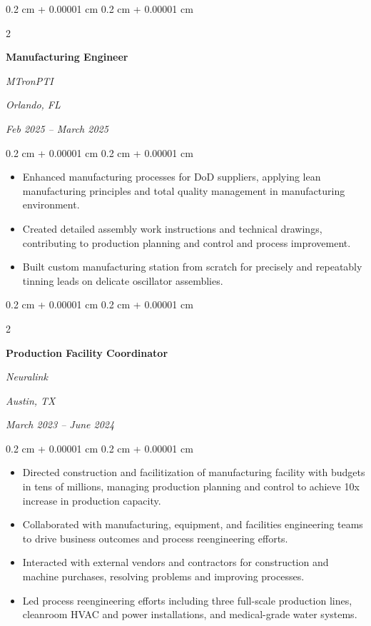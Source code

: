 \documentclass[10pt, letterpaper]{article}
\newenvironment{highlights}{
    \begin{itemize}[
        topsep=0.10 cm,
        parsep=0.10 cm,
        partopsep=0pt,
        itemsep=0pt,
        leftmargin=0.4 cm + 10pt
    ]
}{
    \end{itemize}
} %
\newenvironment{onecolentry}{
    \begin{adjustwidth}{
        0.2 cm + 0.00001 cm
    }{
        0.2 cm + 0.00001 cm
    }
}{
    \end{adjustwidth}
} %
\newenvironment{twocolentry}[2][]{
    \onecolentry
    \def\secondColumn{#2}
    \setcolumnwidth{\fill, 4.5 cm}
    \begin{paracol}{2}
}{
    \switchcolumn \raggedleft \secondColumn
    \end{paracol}
    \endonecolentry
} %
\begin{document}
        \vspace{0.35 cm}

        \begin{twocolentry}{
        \textit{Orlando, FL}    
            
        \textit{Feb 2025 – March 2025}}
            \textbf{Manufacturing Engineer}
            
            \textit{MTronPTI}
        \end{twocolentry}

        \vspace{0.10 cm}
        \begin{onecolentry}
            \begin{highlights}
                \item Enhanced manufacturing processes for DoD suppliers, applying lean manufacturing principles and total quality management in manufacturing environment.
                \item Created detailed assembly work instructions and technical drawings, contributing to production planning and control and process improvement.
                \item Built custom manufacturing station from scratch for precisely and repeatably tinning leads on delicate oscillator assemblies.
            \end{highlights}
        \end{onecolentry}


        \vspace{0.35 cm}

        \begin{twocolentry}{
        \textit{Austin, TX}    
            
        \textit{March 2023 – June 2024}}
            \textbf{Production Facility Coordinator}
            
            \textit{Neuralink}
        \end{twocolentry}

        \vspace{0.10 cm}
        \begin{onecolentry}
            \begin{highlights}
                \item Directed construction and facilitization of manufacturing facility with budgets in tens of millions, managing production planning and control to achieve 10x increase in production capacity.
                \item Collaborated with manufacturing, equipment, and facilities engineering teams to drive business outcomes and process reengineering efforts.
                \item Interacted with external vendors and contractors for construction and machine purchases, resolving problems and improving processes.
                \item Led process reengineering efforts including three full-scale production lines, cleanroom HVAC and power installations, and medical-grade water systems.
            \end{highlights}
        \end{onecolentry}
\end{document}
